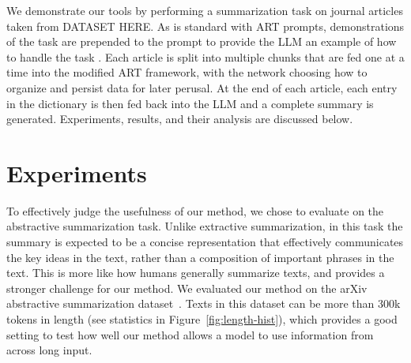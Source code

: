 \documentclass{article}
\begin{document}
We demonstrate our tools by performing a summarization task on journal articles taken from DATASET HERE.
As is standard with ART prompts, demonstrations of the task are prepended to the prompt to provide the LLM an example of how to handle the task \cite{paranjape2023art}.
Each article is split into multiple chunks that are fed one at a time into the modified ART framework, with the network choosing how to organize and persist data for later perusal.
At the end of each article, each entry in the dictionary is then fed back into the LLM and a complete summary is generated. Experiments, results, and their analysis are discussed below.

\section{Experiments}

To effectively judge the usefulness of our method, we chose to evaluate on the abstractive summarization task. Unlike extractive summarization, in this task the summary is expected to be a concise representation that effectively communicates the key ideas in the text, rather than a composition of important phrases in the text. This is more like how humans generally summarize texts, and provides a stronger challenge for our method. We evaluated our method on the arXiv abstractive summarization dataset~\cite{cohan-etal-2018-discourse}. Texts in this dataset can be more than 300k tokens in length (see statistics in Figure~\ref{fig:length-hist}), which provides a good setting to test how well our method allows a model to use information from across long input.
\end{document}
